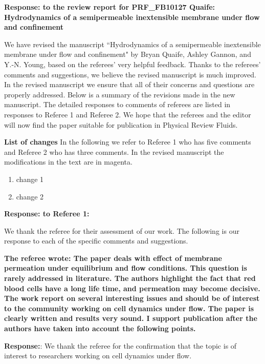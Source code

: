 \documentclass[12pt]{article}
\begin{document}
{\large \bf {\bf Response:} to the review report for PRF\_FB10127 Quaife: Hydrodynamics of a semipermeable inextensible membrane under flow and confinement}
\vspace{0.5cm}

We have revised the manuscript ``Hydrodynamics of a semipermeable inextensible membrane under flow and confinement"  
by Bryan Quaife, Ashley Gannon, and Y.-N. Young, 
based on 
the referees' very helpful feedback.  
Thanks to the referees' comments
and suggestions, we believe the revised manuscript is much
improved. 
In the revised manuscript we ensure that
all of their concerns and questions are properly addressed.
Below is a summary of the revisions made in the new manuscript.
The detailed responses to comments of referees are listed in 
responses to Referee 1 and Referee 2.
We hope that the referees and the
editor will now find the paper suitable for publication in 
Physical Review Fluids.

\vspace{0.5cm}
{\large \bf List of changes}
In the following we refer to Referee 1 who has five comments and Referee
2 who has three comments. In the revised manuscript the modifications in
the text are in magenta.

\begin{enumerate}
\item{change 1}
\item{change 2}
\end{enumerate}

\newpage
\vspace{0.5cm}
{\large \bf {\bf Response:} to Referee 1:}
\vspace{0.5cm}

We thank the referee for their assessment of our work. The following is
our response to each of the specific comments and suggestions.


{\bf The referee wrote:
The paper deals with effect of membrane permeation under equilibrium
and flow conditions. This question is rarely addressed in literature.
The authors highlight the fact that red blood cells have a long life
time, and permeation may become decisive. The work report on several
interesting issues and should be of interest to the community working
on cell dynamics under flow. The paper is clearly written and results
very sound. I support publication after the authors have taken into
account the following points.
}

\noindent
{\bf Response:}: We thank the referee for the confirmation that the topic is of interest to researchers working on cell dynamics under flow.
\end{document}
